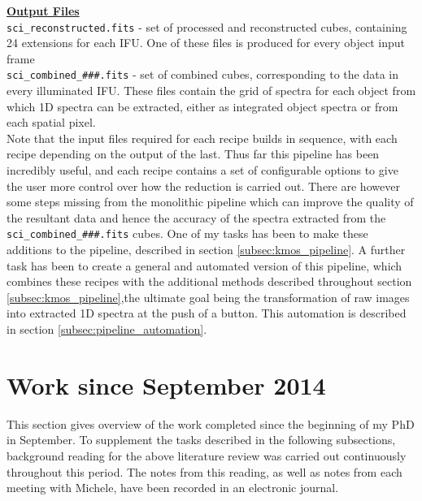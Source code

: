 \documentclass{literature}
\begin{document}
\noindent
\textbf{\underline{Output Files}} \\	
\noindent
{\tt{sci\_reconstructed.fits}} - set of processed and reconstructed cubes, containing 24 extensions for each IFU. One of these files is produced for every object input frame \\
\noindent
{\tt{sci\_combined\_\#\#\#.fits}} - set of combined cubes, corresponding to the data in every illuminated IFU. These files contain the grid of spectra for each object from which 1D spectra can be extracted, either as integrated object spectra or from each spatial pixel.  \\


\noindent
Note that the input files required for each recipe builds in sequence, with each recipe depending on the output of the last. Thus far this pipeline has been incredibly useful, and each recipe contains a set of configurable options to give the user more control over how the reduction is carried out. There are however some steps missing from the monolithic pipeline which can improve the quality of the resultant data and hence the accuracy of the spectra extracted from the {\tt{sci\_combined\_\#\#\#.fits}} cubes. One of my tasks has been to make these additions to the pipeline, described in section \ref{subsec:kmos_pipeline}. A further task has been to create a general and automated version of this pipeline, which combines these recipes with the additional methods described throughout section \ref{subsec:kmos_pipeline},the ultimate goal being the transformation of raw images into extracted 1D spectra at the push of a button. This automation is described in section \ref{subsec:pipeline_automation}. 




\section{Work since September 2014}\label{sec:work}
This section gives overview of the work completed since the beginning of my PhD in September. To supplement the tasks described in the following subsections, background reading for the above literature review was carried out continuously throughout this period. The notes from this reading, as well as notes from each meeting with Michele, have been recorded in an electronic journal. 
\end{document}
